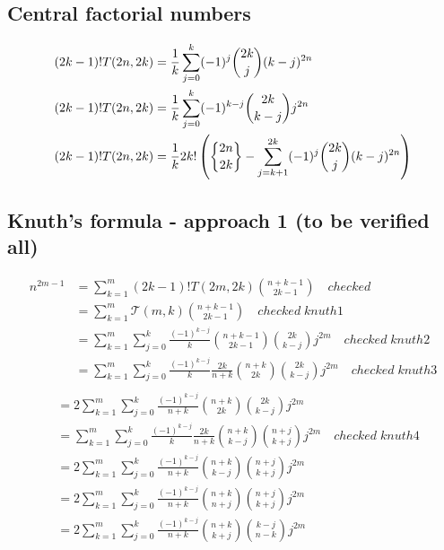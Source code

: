 \subsection{Central factorial numbers}\label{subsec:central-factorial-numbers}
\begin{align*}
(2k-1)!T(2n,2k) &= \frac{1}{k} \sum_{j=0}^{k} (-1)^j \binom{2k}{j} (k-j)^{2n} \\
(2k-1)! T(2n,2k) &= \frac{1}{k} \sum_{j=0}^{k} (-1)^{k-j} \binom{2k}{k-j} j^{2n} \\
(2k-1)! T(2n,2k) &= \frac{1}{k} 2k! \left( \stirlingii{2n}{2k} -  \sum_{j=k+1}^{2k} (-1)^j \binom{2k}{j} (k-j)^{2n}\right) \\
\end{align*}

\subsection{Knuth's formula - approach 1 (to be verified all)}\label{subsec:knuth's-formula---approach-1-(to-be-verified-all)}
\begin{align*}
    n^{2m-1}
    &= \sum_{k=1}^{m} (2k-1)! T(2m,2k) \binom{n+k-1}{2k-1} \quad checked \\
    &= \sum_{k=1}^{m} \mathcal{T}(m,k) \binom{n+k-1}{2k-1} \quad checked \;  knuth1\\
    &= \sum_{k=1}^{m} \sum_{j=0}^{k} \frac{(-1)^{k-j}}{k} \binom{n+k-1}{2k-1} \binom{2k}{k-j} j^{2m} \quad checked \; knuth2 \\
    &= \sum_{k=1}^{m} \sum_{j=0}^{k} \frac{(-1)^{k-j}}{k} \frac{2k}{n+k} \binom{n+k}{2k} \binom{2k}{k-j} j^{2m} \quad checked \; knuth3 \\
\end{align*}
\begin{align*}
    &= 2\sum_{k=1}^{m} \sum_{j=0}^{k} \frac{(-1)^{k-j}}{n+k} \binom{n+k}{2k} \binom{2k}{k-j} j^{2m}  \\
    &= \sum_{k=1}^{m} \sum_{j=0}^{k} \frac{(-1)^{k-j}}{k} \frac{2k}{n+k} \binom{n+k}{k-j} \binom{n+j}{k+j} j^{2m} \quad checked \; knuth4 \\
    &= 2\sum_{k=1}^{m} \sum_{j=0}^{k} \frac{(-1)^{k-j}}{n+k} \binom{n+k}{k-j} \binom{n+j}{k+j} j^{2m} \\
    &= 2\sum_{k=1}^{m} \sum_{j=0}^{k} \frac{(-1)^{k-j}}{n+k} \binom{n+k}{n+j} \binom{n+j}{k+j} j^{2m} \\
    &= 2\sum_{k=1}^{m} \sum_{j=0}^{k} \frac{(-1)^{k-j}}{n+k} \binom{n+k}{k+j} \binom{k-j}{n-k} j^{2m} \\
\end{align*}

